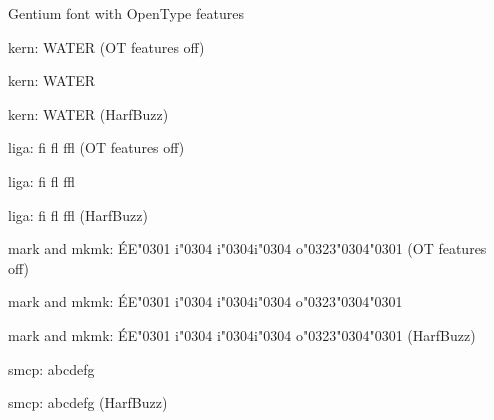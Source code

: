 \page

Gentium font with OpenType features\par
\smallskip
kern: {\gentiumOToff WATER} (OT features off)\par
kern: WATER\par
kern: {\gentiumHB WATER} (HarfBuzz)\par
\smallskip
liga: {\gentiumOToff fi fl ffl} (OT features off)\par
liga: fi fl ffl\par
liga: {\gentiumHB fi fl ffl} (HarfBuzz)\par
\smallskip
mark and mkmk: {\gentiumOToff ÉE{\char"0301} i{\char"0304} i{\char"0304}i{\char"0304} o{\char"0323}{\char"0304}{\char"0301}} (OT features off)\par
mark and mkmk: ÉE{\char"0301} i{\char"0304} i{\char"0304}i{\char"0304} o{\char"0323}{\char"0304}{\char"0301}\par
mark and mkmk: {\gentiumHB ÉE{\char"0301} i{\char"0304} i{\char"0304}i{\char"0304} o{\char"0323}{\char"0304}{\char"0301}} (HarfBuzz)\par
\smallskip
smcp: {\gentiumSC abcdefg}\par
smcp: {\gentiumHBSC abcdefg} (HarfBuzz)\par
